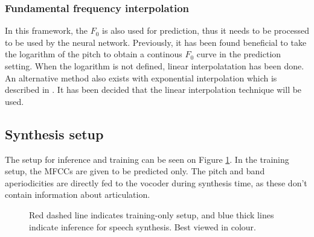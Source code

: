\documentclass[a4paper]{article}
\begin{document}
\subsubsection{Fundamental frequency interpolation}

In this framework, the \( F_0 \) is also used for prediction, thus it
needs to be processed to be used by the neural network. 
Previously, it has been found beneficial to take the logarithm of the
pitch to obtain a continous \( F_0 \) curve in the prediction setting.
When the logarithm is not defined, linear  interpolatation has been done. \cite{Gonzalez2017}
An alternative method also exists with exponential interpolation
which is described in \cite{Chen1997}. It has been decided that the
linear interpolation technique will be used. 

\subsection{Synthesis setup}

The setup for inference and training can be seen on Figure \ref{fig:structure}.
In the training setup, the MFCCs are given to be predicted only.
The pitch and band aperiodicities are directly fed to the vocoder
during synthesis time, as these don't contain information about articulation. 

\begin{figure}
  \caption{Red dashed line indicates training-only setup, and blue thick lines indicate inference for speech synthesis. Best viewed in colour.}
  \label{fig:structure}
\end{figure}
\end{document}
